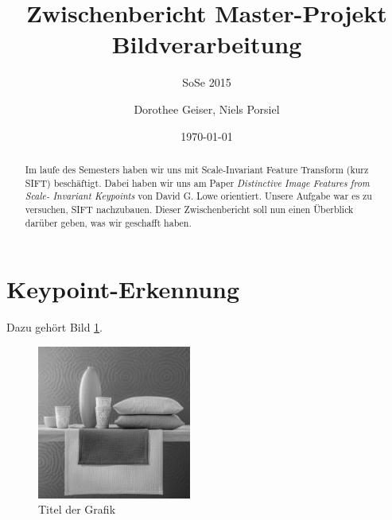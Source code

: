 \documentclass[a4paper,12pt]{scrartcl}
\title{Zwischenbericht Master-Projekt Bildverarbeitung}
\subtitle{SoSe 2015}
\author{Dorothee Geiser, Niels Porsiel}
\date{\today}
\begin{document}
\maketitle
\thispagestyle{empty}
\vspace{0.3\textheight}

\begin{abstract}
Im laufe des Semesters haben wir uns mit Scale-Invariant Feature Transform (kurz SIFT)
beschäftigt. Dabei haben wir uns am Paper \textit{Distinctive Image Features from Scale-
Invariant Keypoints} von David G. Lowe \cite{Lowe} orientiert. Unsere Aufgabe war es zu versuchen, 
SIFT nachzubauen. Dieser Zwischenbericht soll nun einen Überblick darüber geben, was wir 
geschafft haben.
\end{abstract}

\newpage

\section{Keypoint-Erkennung}
Dazu gehört Bild \ref{Bild1}.

\begin{figure}[htbp]
  \centering
  \includegraphics[width=0.45\textwidth]{bild}
  \caption{Titel der Grafik}
  \label{Bild1}
\end{figure}
\end{document}
